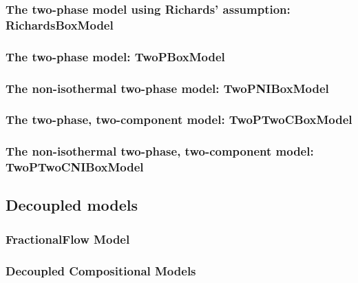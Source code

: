 \subsubsection{The two-phase model using Richards' assumption: RichardsBoxModel} 


\subsubsection{The two-phase model: TwoPBoxModel}


\subsubsection{The non-isothermal two-phase model: TwoPNIBoxModel} 


\subsubsection{The two-phase, two-component model: TwoPTwoCBoxModel} 


\subsubsection{The non-isothermal two-phase, two-component model: TwoPTwoCNIBoxModel} 



\subsection{Decoupled models}

\subsubsection{FractionalFlow Model}


\subsubsection{Decoupled Compositional Models}




